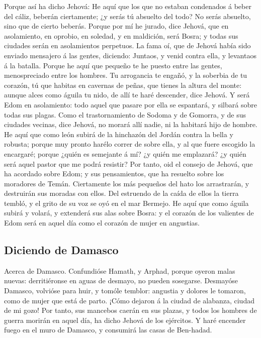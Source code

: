  Porque así ha dicho Jehová: He aquí que los que no
estaban condenados á beber del cáliz, beberán ciertamente; ¿y serás tú
absuelto del todo? No serás absuelto, sino que de cierto beberás.
 Porque por mí he jurado, dice Jehová, que en
asolamiento, en oprobio, en soledad, y en maldición, será Bosra; y todas
sus ciudades serán en asolamientos perpetuos.  La fama
oí, que de Jehová había sido enviado mensajero á las gentes, diciendo:
Juntaos, y venid contra ella, y levantaos á la batalla. 
Porque he aquí que pequeño te he puesto entre las gentes, menospreciado
entre los hombres.  Tu arrogancia te engañó, y la
soberbia de tu corazón, tú que habitas en cavernas de peñas, que tienes
la altura del monte: aunque alces como águila tu nido, de allí te haré
descender, dice Jehová.  Y será Edom en asolamiento: todo
aquel que pasare por ella se espantará, y silbará sobre todas sus
plagas.  Como el trastornamiento de Sodoma y de Gomorra,
y de sus ciudades vecinas, dice Jehová, no morará allí nadie, ni la
habitará hijo de hombre.  He aquí que como león subirá de
la hinchazón del Jordán contra la bella y robusta; porque muy pronto
harélo correr de sobre ella, y al que fuere escogido la encargaré;
porque ¿quién es semejante á mí? ¿y quién me emplazará? ¿y quién será
aquel pastor que me podrá resistir?  Por tanto, oid el
consejo de Jehová, que ha acordado sobre Edom; y sus pensamientos, que
ha resuelto sobre los moradores de Temán. Ciertamente los más pequeños
del hato los arrastrarán, y destruirán sus moradas con ellos.
 Del estruendo de la caída de ellos la tierra tembló, y
el grito de su voz se oyó en el mar Bermejo.  He aquí que
como águila subirá y volará, y extenderá sus alas sobre Bosra: y el
corazón de los valientes de Edom será en aquel día como el corazón de
mujer en angustias.

\hypertarget{diciendo-de-damasco}{%
\subsection{Diciendo de Damasco}\label{diciendo-de-damasco}}

 Acerca de Damasco. Confundióse Hamath, y Arphad, porque
oyeron malas nuevas: derritiéronse en aguas de desmayo, no pueden
sosegarse.  Desmayóse Damasco, volvióse para huir, y
tomóle temblor: angustia y dolores le tomaron, como de mujer que está de
parto.  ¡Cómo dejaron á la ciudad de alabanza, ciudad de
mi gozo!  Por tanto, sus mancebos caerán en sus plazas, y
todos los hombres de guerra morirán en aquel día, ha dicho Jehová de los
ejércitos.  Y haré encender fuego en el muro de Damasco,
y consumirá las casas de Ben-hadad.

